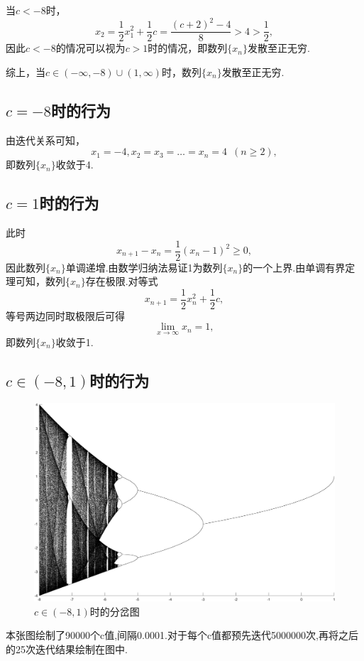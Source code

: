 \documentclass[a4paper]{article}%
\begin{document}
当$c<-8$时，\[x_2=\frac{1}{2}x_1^2+\frac{1}{2}c=\frac{(c+2)^2-4}{8}>4>\frac{1}{2},\]
因此$c<-8$的情况可以视为$c>1$时的情况，即数列$\{x_n\}$发散至正无穷.

综上，当$c\in (-\infty ,-8)\cup  (1,\infty)$时，数列$\{x_n\}$发散至正无穷.
\subsection{$c=-8$时的行为}
由迭代关系可知，\[x_1=-4,x_2=x_3=\ldots =x_n=4\phantom{1}(n\ge2),\]
即数列$\{x_n\}$收敛于4.
\subsection{$c=1$时的行为}
此时\[x_{n+1}-x_n=\frac{1}{2}(x_n-1)^2\ge0,\]
因此数列$\{x_n\}$单调递增.由数学归纳法易证1为数列$\{x_n\}$的一个上界.由单调有界定理可知，数列$\{x_n\}$存在极限.对等式\[x_{n+1}=\frac{1}{2}x_{n}^2+\frac{1}{2}c,\]等号两边同时取极限后可得\[\lim _{x\to\infty}{x_n}=1,\]
即数列$\{x_n\}$收敛于1.
\subsection{$c\in (-8,1)$时的行为}
\begin{figure}[H]
    \centering
    \includegraphics[scale=0.3]{图一}
    \caption[图一]{$c\in(-8,1)$时的分岔图}\label{fig-图一}
    \end{figure}
{本张图绘制了90000个c值,间隔0.0001.对于每个c值都预先迭代5000000次,再将之后的25次迭代结果绘制在图中.}
\end{document}
